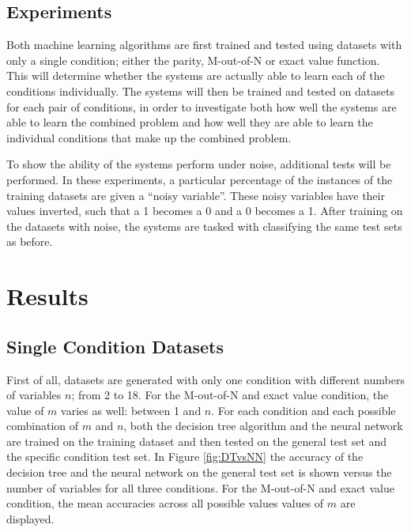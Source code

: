 \documentclass[letterpaper]{article} %
\begin{document}
\subsection{Experiments}
Both machine learning algorithms are first trained and tested using datasets with only a single condition; either the parity, M-out-of-N or exact value function. This will determine whether the systems are actually able to learn each of the conditions individually. The systems will then be trained and tested on datasets for each pair of conditions, in order to investigate both how well the systems are able to learn the combined problem and how well they are able to learn the individual conditions that make up the combined problem. 

To show the ability of the systems perform under noise, additional tests will be performed. In these experiments, a particular percentage of the instances of the training datasets are given a ``noisy variable''. These noisy variables have their values inverted, such that a 1 becomes a 0 and a 0 becomes a 1. After training on the datasets with noise, the systems are tasked with classifying the same test sets as before. 

\section{Results}

\subsection{Single Condition Datasets}
First of all, datasets are generated with only one condition with different numbers of variables $n$; from 2 to 18.  For the M-out-of-N and exact value condition, the value of $m$ varies as well: between 1 and $n$. For each condition and each possible combination of $m$ and $n$, both the decision tree algorithm and the neural network are trained on the training dataset and then tested on the general test set and the specific condition test set. In Figure \ref{fig:DTvsNN} the accuracy of the decision tree and the neural network on the general test set is shown versus the number of variables for all three conditions. For the M-out-of-N and exact value condition, the mean accuracies across all possible values values of $m$ are displayed.
\end{document}
